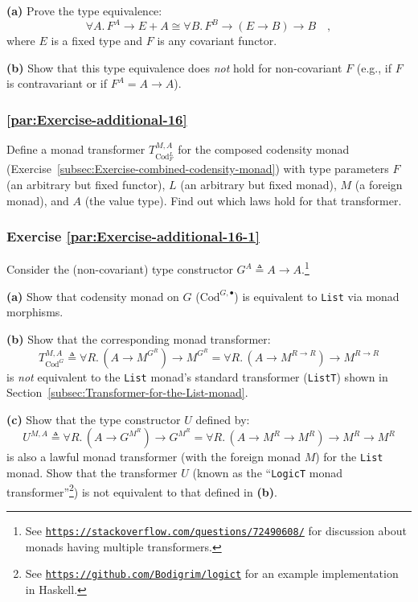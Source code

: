 \textbf{(a)} Prove the type equivalence:
\[
\forall A.\,F^{A}\rightarrow E+A\cong\forall B.\,F^{B}\rightarrow(E\rightarrow B)\rightarrow B\quad,
\]
where $E$ is a fixed type and $F$ is any covariant functor.

\textbf{(b)} Show that this type equivalence does \emph{not} hold
for non-covariant $F$ (e.g., if $F$ is contravariant or if $F^{A}=A\rightarrow A$).

\subsubsection{\label{par:Exercise-additional-16}\ref{par:Exercise-additional-16}}

Define a monad transformer $T_{\text{Cod}_{F}^{L}}^{M,A}$ for the
composed codensity monad (Exercise~\ref{subsec:Exercise-combined-codensity-monad})
with type parameters $F$ (an arbitrary but fixed functor), $L$ (an
arbitrary but fixed monad), $M$ (a foreign monad), and $A$ (the
value type). Find out which laws hold for that transformer.

\subsubsection{Exercise \label{par:Exercise-additional-16-1}\ref{par:Exercise-additional-16-1}}

Consider the (non-covariant) type constructor $G^{A}\triangleq A\rightarrow A$.\footnote{See \texttt{\href{https://stackoverflow.com/questions/72490608/}{https://stackoverflow.com/questions/72490608/}}
for discussion about monads having multiple transformers.}

\textbf{(a)} Show that codensity monad on $G$ ($\text{Cod}^{G,\bullet}$)
is equivalent to \lstinline!List! via monad morphisms.

\textbf{(b)} Show that the corresponding monad transformer: 
\[
T_{\text{Cod}^{G}}^{M,A}\triangleq\forall R.\,(A\rightarrow M^{G^{R}})\rightarrow M^{G^{R}}=\forall R.\,(A\rightarrow M^{R\rightarrow R})\rightarrow M^{R\rightarrow R}
\]
is \emph{not} equivalent to the \lstinline!List! monad\textsf{'}s standard
transformer (\lstinline!ListT!) shown in Section~\ref{subsec:Transformer-for-the-List-monad}.

\textbf{(c)} Show that the type constructor $U$ defined by:
\[
U^{M,A}\triangleq\forall R.\,(A\rightarrow G^{M^{R}})\rightarrow G^{M^{R}}=\forall R.\,(A\rightarrow M^{R}\rightarrow M^{R})\rightarrow M^{R}\rightarrow M^{R}
\]
is also a lawful monad transformer (with the foreign monad $M$) for
the \lstinline!List! monad. Show that the transformer $U$ (known
as the \textsf{``}\lstinline!LogicT! monad transformer\textsf{''}\footnote{See \texttt{\href{https://github.com/Bodigrim/logict}{https://github.com/Bodigrim/logict}}
for an example implementation in Haskell.}) is not equivalent to that defined in \textbf{(b)}. 

